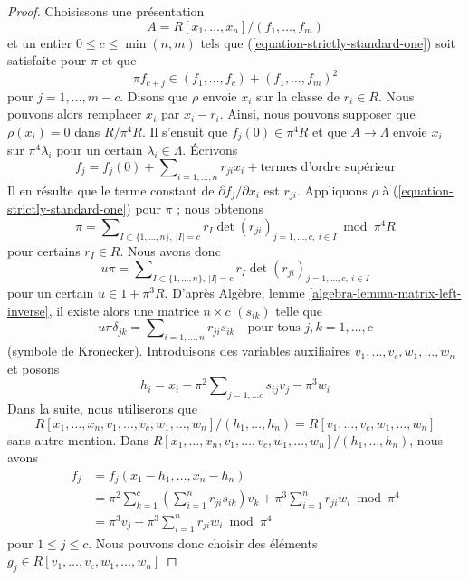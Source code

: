 \begin{proof}
Choisissons une présentation
$$
A = R[x_1, \ldots, x_n]/(f_1, \ldots, f_m)
$$
et un entier $0 \leq c \leq \min(n, m)$ tels que
(\ref{equation-strictly-standard-one}) soit satisfaite pour $\pi$ et que
\begin{equation}
\label{equation-star}
\pi f_{c + j} \in (f_1, \ldots, f_c) + (f_1, \ldots, f_m)^2
\end{equation}
pour $j = 1, \ldots, m - c$. Disons que $\rho$ envoie $x_i$ sur la classe de
$r_i \in R$. Nous pouvons alors remplacer $x_i$ par $x_i - r_i$. Ainsi, nous pouvons
supposer que $\rho(x_i) = 0$ dans $R/\pi^4 R$. Il s'ensuit que
$f_j(0) \in \pi^4R$ et que $A \to \Lambda$ envoie $x_i$
sur $\pi^4\lambda_i$ pour un certain $\lambda_i \in \Lambda$. Écrivons
$$
f_j = f_j(0) + \sum\nolimits_{i = 1, \ldots, n} r_{ji} x_i + \text{termes d'ordre supérieur}
$$
Il en résulte que le terme constant de $\partial f_j/\partial x_i$ est
$r_{ji}$. Appliquons $\rho$ à (\ref{equation-strictly-standard-one})
pour $\pi$ ; nous obtenons
$$
\pi = \sum\nolimits_{I \subset \{1, \ldots, n\},\ |I| = c}
r_I \det(r_{ji})_{j = 1, \ldots, c,\ i \in I} \bmod \pi^4R
$$
pour certains $r_I \in R$. Nous avons donc
$$
u\pi = \sum\nolimits_{I \subset \{1, \ldots, n\},\ |I| = c}
r_I \det(r_{ji})_{j = 1, \ldots, c,\ i \in I}
$$
pour un certain $u \in 1 + \pi^3R$. D'après
Algèbre, lemme \ref{algebra-lemma-matrix-left-inverse},
il existe alors une matrice $n \times c$ $(s_{ik})$ telle que
$$
u\pi \delta_{jk} = \sum\nolimits_{i = 1, \ldots, n} r_{ji}s_{ik}\quad
\text{pour tous } j, k = 1, \ldots, c
$$
(symbole de Kronecker). Introduisons des variables auxiliaires
$v_1, \ldots, v_c, w_1, \ldots, w_n$ et posons
$$
h_i = x_i - \pi^2 \sum\nolimits_{j = 1, \ldots c} s_{ij} v_j - \pi^3 w_i
$$
Dans la suite, nous utiliserons que
$$
R[x_1, \ldots, x_n, v_1, \ldots, v_c, w_1, \ldots, w_n]/
(h_1, \ldots, h_n) = R[v_1, \ldots, v_c, w_1, \ldots, w_n]
$$
sans autre mention. Dans
$R[x_1, \ldots, x_n, v_1, \ldots, v_c, w_1, \ldots, w_n]/
(h_1, \ldots, h_n)$, nous avons
\begin{align*}
f_j & = f_j(x_1 - h_1, \ldots, x_n - h_n) \\
& =
\pi^2 \sum\nolimits_{k = 1}^c
\left(\sum\nolimits_{i = 1}^n r_{ji} s_{ik}\right) v_k
+
\pi^3 \sum\nolimits_{i = 1}^n r_{ji}w_i \bmod \pi^4 \\
& =
\pi^3 v_j + \pi^3 \sum\nolimits_{i = 1}^n r_{ji}w_i \bmod \pi^4
\end{align*}
pour $1 \leq j \leq c$. Nous pouvons donc choisir des éléments
$g_j \in R[v_1, \ldots, v_c, w_1, \ldots, w_n]$

\end{proof}
